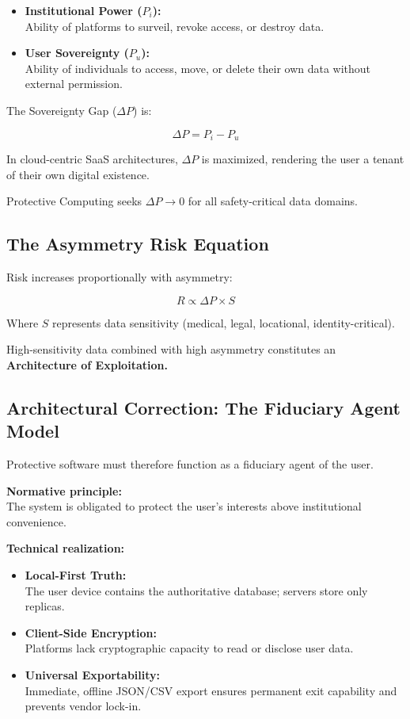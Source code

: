 \documentclass[12pt]{article}
\begin{document}
\begin{itemize}
\item \textbf{Institutional Power ($P_i$):}\\
  Ability of platforms to surveil, revoke access, or destroy data.
\item \textbf{User Sovereignty ($P_u$):}\\
  Ability of individuals to access, move, or delete their own data without external permission.
\end{itemize}

The Sovereignty Gap ($\Delta P$) is:

\[
\Delta P = P_i - P_u
\]

In cloud-centric SaaS architectures, $\Delta P$ is maximized, rendering the user a tenant of their own digital existence.

Protective Computing seeks $\Delta P \rightarrow 0$ for all safety-critical data domains.

\subsection{The Asymmetry Risk Equation}
Risk increases proportionally with asymmetry:

\[
R \propto \Delta P \times S
\]

Where $S$ represents data sensitivity (medical, legal, locational, identity-critical).

High-sensitivity data combined with high asymmetry constitutes an \textbf{Architecture of Exploitation.}

\subsection{Architectural Correction: The Fiduciary Agent Model}
Protective software must therefore function as a fiduciary agent of the user.

\textbf{Normative principle:}\\
The system is obligated to protect the user's interests above institutional convenience.

\textbf{Technical realization:}

\begin{itemize}
\item \textbf{Local-First Truth:}\\
  The user device contains the authoritative database; servers store only replicas.
\item \textbf{Client-Side Encryption:}\\
  Platforms lack cryptographic capacity to read or disclose user data.
\item \textbf{Universal Exportability:}\\
  Immediate, offline JSON/CSV export ensures permanent exit capability and prevents vendor lock-in.
\end{itemize}
\end{document}
